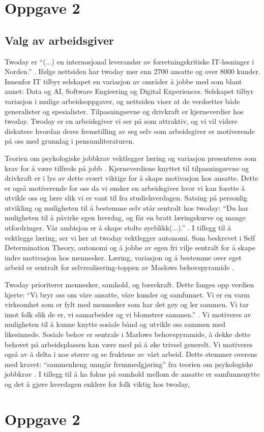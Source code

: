 \section{Oppgave 2}
\subsection{Valg av arbeidsgiver}
Twoday er \enquote{(...) en internasjonal leverandør av forretningskritiske IT-løsninger i Norden.}
\parencite{Twoday.no}. Ifølge nettsiden har twoday mer enn 2700 ansatte og over 8000 kunder. Innenfor IT
tilbyr selskapet en variasjon av områder å jobbe med som blant annet: Data og AI, Software Engieering
og Digital Experiences. Selskapet tilbyr variasjon i mulige arbeidsoppgaver, og nettsiden viser at de
verdsetter både generalister og spesialister. Tilpasningsevne og drivkraft er kjerneverdier hos twoday. Twoday er
en arbeidsgiver vi ser på som attraktiv, og vi vil videre diskutere hvordan deres fremstilling av seg selv som 
arbeidsgiver er motiverende på oss med grunnlag i pensumliteraturen. 

Teorien om psykologiske jobbkrav vektlegger læring og variasjon presenteres som krav for å være tilfreds på jobb \parencite[][s.120]{Teknologiledelse}. 
Kjerneverdiene knyttet til tilpasningsevne og drivkraft er i lys av dette svært viktige for å skape motivasjon hos ansatte. Dette er også motiverende for 
oss da vi ønsker en arbeidsgiver hvor vi kan forstte å utvikle oss og lære slik vi er vant til fra studiehverdagen.
Satsing på personlig utvikling og muligheten til å bestemme selv står sentralt hos twoday: \enquote{Du har muligheten
til å påvirke egen hverdag, og får en bratt læringskurve og mange utfordringer. Vår ambisjon er å
skape stolte øyeblikk(...).} \parencite["Graduateprogrammet"]{twoday.no}. I tillegg til å vektlegge læring, ser
vi her at twoday vektlegger autonomi. Som beskrevet i Self Determination Theory\parencite[][s.121]{Teknologiledelse},
autonomi og å jobbe av egen fri vilje sentralt for å skape indre motivasjon hos mennesker. Læring,
variasjon og å bestemme over eget arbeid er sentralt for selvrealisering-toppen av Maslows
behovspyramide \parencite[][s.116]{Teknologiledelse}.

Twoday prioriterer mennesker, samhold, og bærekraft. Dette fanges opp verdien hjerte:
“Vi bryr oss om våre ansatte, våre kunder og samfunnet. Vi er en varm virksomhet som er fylt
med mennesker som har det gøy og ler sammen. Vi tar imot folk slik de er, vi samarbeider og vi
blomstrer sammen.” \parencite["Om oss"]{twoday.no}. Vi motiveres av muligheten til å kunne knytte sosiale bånd
og utvikle oss sammen med likesinnede. Sosiale behov er sentrale i Marlows behovspyramide, å dekke
dette behovet på arbeidsplassen kan være med på å øke trivsel generelt. Vi motiveres også av å delta
i noe større og se fruktene av vårt arbeid. Dette stemmer overens med kravet: “sammenheng unngår
fremmedgjøring” fra teorien om psykologiske jobbkrav \parencite[][s.120]{Teknologiledelse}. I tillegg til å ha fokus på samhold
mellom de ansatte er samfunnsnytte og det å gjøre hverdagen enklere for folk viktig hos
twoday, \section{Oppgave 2}

